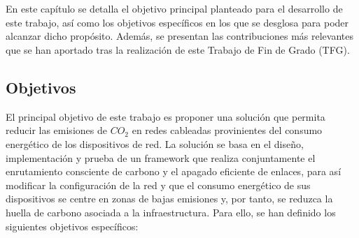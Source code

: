 \chapter{\objectivesname} \label{chp:objetivos}

En este capítulo se detalla el objetivo principal planteado para el desarrollo de este trabajo, así como los objetivos específicos en los que se desglosa para poder alcanzar dicho propósito. Además, se presentan las contribuciones más relevantes que se han aportado tras la realización de este Trabajo de Fin de Grado (TFG).

\section{Objetivos}

El principal objetivo de este trabajo es proponer una solución que permita reducir las emisiones de $CO_2$ en redes cableadas provinientes del consumo energético de los dispositivos de red. La solución se basa en el diseño, implementación y prueba de un framework que realiza conjuntamente el enrutamiento consciente de carbono y el apagado eficiente de enlaces, para así modificar la configuración de la red y que el consumo energético de sus dispositivos se centre en zonas de bajas emisiones y, por tanto, se reduzca la huella de carbono asociada a la infraestructura. Para ello, se han definido los siguientes objetivos específicos:

